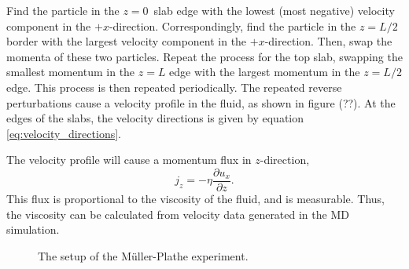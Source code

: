 Find the particle in the \(z = 0\) slab edge with the lowest 
(most negative) velocity component in the \(+x\)-direction.
Correspondingly, find the particle in the \(z = L/2\) border 
with the largest velocity component in the \(+x\)-direction.
Then, swap the momenta of these two particles.
Repeat the process for the top slab, swapping the smallest momentum 
in the \(z = L\) edge with the largest momentum in the \(z = L/2\) edge.
This process is then repeated periodically.
The repeated reverse perturbations cause a velocity profile in the fluid,
as shown in figure (??). %
At the edges of the slabs, the velocity directions 
is given by equation \eqref{eq:velocity_directions}.

The velocity profile will cause a momentum flux in $z$-direction,
\[
    \label{eq:momentum_flux}
    j_z = -\eta \frac{\partial u_x}{\partial z}.
\]
This flux is proportional to the viscosity of the fluid, and is measurable.
Thus, the viscosity can be calculated from velocity data generated in the 
MD simulation.

\begin{figure}
    \begin{center}
        
        \caption{The setup of the Müller-Plathe experiment.}
    \end{center}
\end{figure}

